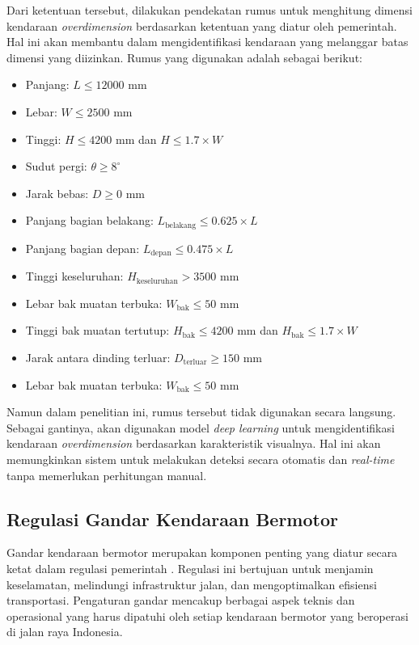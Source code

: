 Dari ketentuan tersebut, dilakukan pendekatan rumus untuk menghitung dimensi kendaraan \emph{overdimension} berdasarkan ketentuan yang diatur oleh pemerintah. Hal ini akan membantu dalam mengidentifikasi kendaraan yang melanggar batas dimensi yang diizinkan. Rumus yang digunakan adalah sebagai berikut:

\begin{itemize}[nolistsep]
  \item Panjang: \( L \leq 12000 \) mm
  \item Lebar: \( W \leq 2500 \) mm
  \item Tinggi: \( H \leq 4200 \) mm dan \( H \leq 1.7 \times W \)
  \item Sudut pergi: \( \theta \geq 8^\circ \)
  \item Jarak bebas: \( D \geq 0 \) mm
  \item Panjang bagian belakang: \( L_{\mathrm{belakang}} \leq 0.625 \times L \)
  \item Panjang bagian depan: \( L_{\mathrm{depan}} \leq 0.475 \times L \)
  \item Tinggi keseluruhan: \( H_{\mathrm{keseluruhan}} > 3500 \) mm
  \item Lebar bak muatan terbuka: \( W_{\mathrm{bak}} \leq 50 \) mm
  \item Tinggi bak muatan tertutup: \( H_{\mathrm{bak}} \leq 4200 \) mm dan \( H_{\mathrm{bak}} \leq 1.7 \times W \)
  \item Jarak antara dinding terluar: \( D_{\mathrm{terluar}} \geq 150 \) mm
  \item Lebar bak muatan terbuka: \( W_{\mathrm{bak}} \leq 50 \) mm
\end{itemize}

Namun dalam penelitian ini, rumus tersebut tidak digunakan secara langsung. Sebagai gantinya, akan digunakan model \emph{deep learning} untuk mengidentifikasi kendaraan \emph{overdimension} berdasarkan karakteristik visualnya. Hal ini akan memungkinkan sistem untuk melakukan deteksi secara otomatis dan \emph{real-time} tanpa memerlukan perhitungan manual.

\subsection{Regulasi Gandar Kendaraan Bermotor}
\label{subsec:regulasigandar}

Gandar kendaraan bermotor merupakan komponen penting yang diatur secara ketat dalam regulasi pemerintah \parencite*{kemenhub2015}. Regulasi ini bertujuan untuk menjamin keselamatan, melindungi infrastruktur jalan, dan mengoptimalkan efisiensi transportasi. Pengaturan gandar mencakup berbagai aspek teknis dan operasional yang harus dipatuhi oleh setiap kendaraan bermotor yang beroperasi di jalan raya Indonesia.

